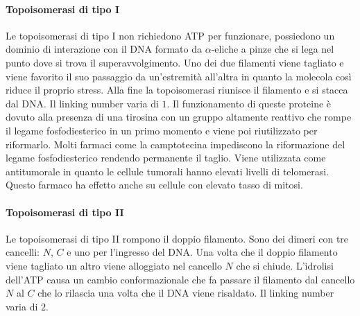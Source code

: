 			\paragraph{Topoisomerasi di tipo I} 
			Le topoisomerasi di tipo I non richiedono ATP per funzionare, possiedono un dominio di interazione con il DNA formato da $\alpha$-eliche a pinze che si lega nel punto dove si trova il superavvolgimento. 
			Uno dei due filamenti viene tagliato e viene favorito il suo passaggio da un'estremit\`a all'altra in quanto la molecola cos\`i riduce il proprio stress. 
			Alla fine  la topoisomerasi riunisce il filamento e si stacca dal DNA. 
			Il linking number varia di $1$. 
			Il funzionamento di queste proteine \`e dovuto alla presenza di una tirosina con un gruppo  altamente reattivo che rompe il legame fosfodiesterico in un primo momento e viene poi riutilizzato per riformarlo. 
			Molti farmaci come la camptotecina impediscono la riformazione del legame fosfodiesterico rendendo permanente il taglio. 
			Viene utilizzata come antitumorale in quanto le cellule tumorali hanno elevati livelli di telomerasi. 
			Questo farmaco ha effetto anche su cellule con elevato tasso di mitosi.

			\paragraph{Topoisomerasi di tipo II}
			Le topoisomerasi di tipo II rompono il doppio filamento. 
			Sono dei dimeri con tre cancelli: $N$, $C$ e uno per l'ingresso del DNA. 
			Una volta che il doppio filamento viene tagliato un altro viene alloggiato nel cancello $N$ che si chiude. 
			L'idrolisi dell'ATP causa un cambio conformazionale che fa passare il filamento dal cancello $N$ al $C$ che lo rilascia una volta che il DNA viene risaldato. 
			Il linking number varia di $2$. 


